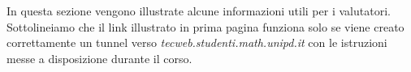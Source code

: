 In questa sezione vengono illustrate alcune informazioni utili per i valutatori.
Sottolineiamo che il link illustrato in prima pagina funziona solo se viene creato correttamente un tunnel verso
\textit{tecweb.studenti.math.unipd.it} con le istruzioni messe a disposizione durante il corso.